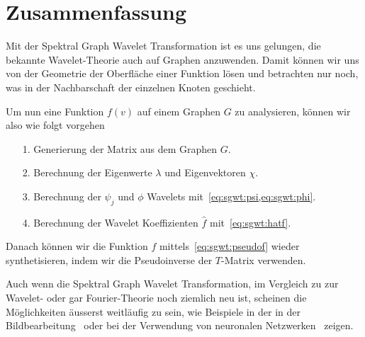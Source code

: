 
\section{Zusammenfassung\label{sec:sgwt:summary}}

Mit der Spektral Graph Wavelet Transformation ist es uns gelungen, die bekannte 
Wavelet-Theorie auch auf Graphen anzuwenden. Damit k\"onnen wir uns von der 
Geometrie der Oberfl\"ache einer Funktion l\"osen und betrachten nur noch, was 
in der Nachbarschaft der einzelnen Knoten geschieht.

Um nun eine Funktion $f(v)$ auf einem Graphen $G$ zu analysieren, k\"onnen wir 
also wie folgt vorgehen
\begin{itemize}
    \item[1.] Generierung der \laplaceL{} Matrix aus dem Graphen $G$.
    \item[2.] Berechnung der Eigenwerte $\lambda$ und Eigenvektoren $\chi$.
    \item[3.] Berechnung der $\psi_j$ und $\phi$ Wavelets 
    mit~\cref{eq:sgwt:psi,eq:sgwt:phi}.
    \item[4.] Berechnung der Wavelet Koeffizienten $\hat{f}$ 
    mit~\cref{eq:sgwt:hatf}.
\end{itemize}
Danach k\"onnen wir die Funktion $f$ mittels~\cref{eq:sgwt:pseudof} wieder 
synthetisieren, indem wir die Pseudoinverse der $T$-Matrix verwenden.

Auch wenn die Spektral Graph Wavelet Transformation, im Vergleich zu zur 
Wavelet- oder gar Fourier-Theorie noch 
ziemlich neu ist, scheinen die M\"oglichkeiten \"ausserst weitl\"aufig zu sein, 
wie Beispiele in der in der Bildbearbeitung~\cite{shuman_emerging_2013} oder 
bei der Verwendung von neuronalen Netzwerken~\cite{xu_graph_2019} zeigen.


